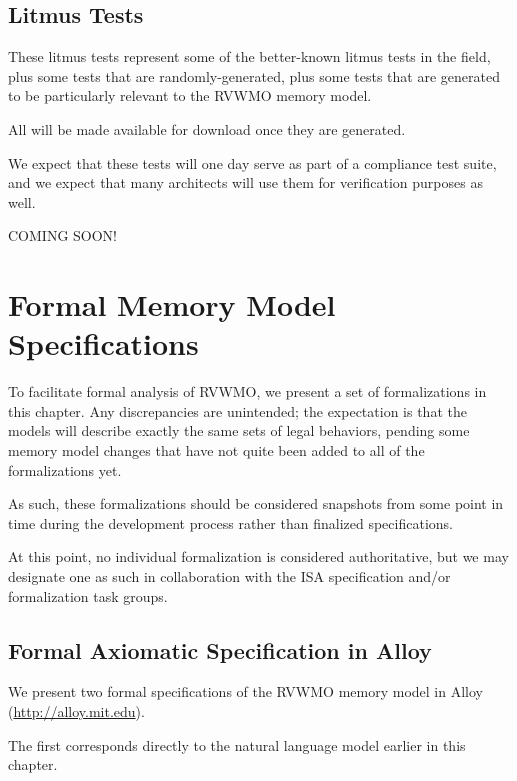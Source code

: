 \section{Litmus Tests}

These litmus tests represent some of the better-known litmus tests in the field, plus some tests that are randomly-generated, plus some tests that are generated to be particularly relevant to the RVWMO memory model.

All will be made available for download once they are generated.

We expect that these tests will one day serve as part of a compliance test suite, and we expect that many architects will use them for verification purposes as well.

COMING SOON!

\chapter{Formal Memory Model Specifications}

\begin{commentary}
  To facilitate formal analysis of RVWMO, we present a set of formalizations in this chapter.  Any discrepancies are unintended; the expectation is that the models will describe exactly the same sets of legal behaviors, pending some memory model changes that have not quite been added to all of the formalizations yet.

  As such, these formalizations should be considered snapshots from some point in time during the development process rather than finalized specifications.

  At this point, no individual formalization is considered authoritative, but we may designate one as such in collaboration with the ISA specification and/or formalization task groups.
\end{commentary}

\section{Formal Axiomatic Specification in Alloy}
\label{sec:alloy}

We present two formal specifications of the RVWMO memory model in Alloy (\url{http://alloy.mit.edu}).

The first corresponds directly to the natural language model earlier in this chapter.

